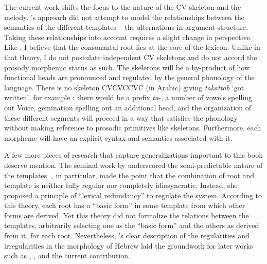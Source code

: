 The current work shifts the focus to the nature of the CV skeleton and the melody. \citeauthor{jjmcc81}'s approach did not attempt to model the relationships between the semantics of the different templates -- the alternations in argument structure. 
Taking these relationships into account requires a slight change in perspective. Like \cite{jjmcc81}, I believe that the consonantal root lies at the core of the lexicon. Unlike in that theory, I do not postulate independent CV skeletons and do not accord the prosody morphemic status as such. The skeletons will be a by-product of how functional heads are pronounced and regulated by the general phonology of the language. There is no skeleton CVCVCCVC (in Arabic) giving \emph{takattab} `got written', for example \citep[392]{jjmcc81}: there would be a prefix \emph{ta}-, a number of vowels spelling out Voice, gemination spelling out an additional head, and the organization of these different segments will proceed in a way that satisfies the phonology without making reference to prosodic primitives like skeletons. Furthermore, each morpheme will have an explicit syntax and semantics associated with it.

A few more pieces of research that capture generalizations important to this book deserve mention. The seminal work by \cite{berman78} underscored the semi-predictable nature of the templates. \citet[Ch.~3]{berman78}, in particular, made the point that the combination of root and template is neither fully regular nor completely idiosyncratic. Instead, she proposed a principle of ``lexical redundancy'' to regulate the system. According to this theory, each root has a ``basic form'' in some template from which other forms are derived. Yet this theory did not formalize the relations between the templates, arbitrarily selecting one as the ``basic form'' and the others as derived from it, for each root. Nevertheless, \citeauthor{berman78}'s clear description of the regularities and irregularities in the morphology of Hebrew laid the groundwork for later works such as \cite{doron03}, \cite{arad05}, \cite{borer13oup} and the current contribution.

